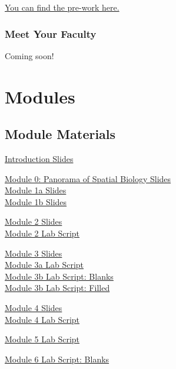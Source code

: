 \documentclass[
]{book}
\begin{document}
\href{https://docs.google.com/forms/d/e/1FAIpQLSeT3dlar3GpewcRe4Yjn5_Do0mR37brQ9eKeWmi2904_Q1AEw/viewform?usp=sf_link}{You can find the pre-work here.}

\hypertarget{meet-your-faculty}{%
\section{Meet Your Faculty}\label{meet-your-faculty}}

Coming soon!

\hypertarget{part-modules}{%
\part{Modules}\label{part-modules}}

\hypertarget{module-materials}{%
\chapter{Module Materials}\label{module-materials}}

\href{https://drive.google.com/file/d/1L0QxUN6YaxNonUczVfyQBeJ4-MWImSc7/view?usp=drive_link}{Introduction Slides}

\href{https://drive.google.com/file/d/1t4Z5u5fH88hJtrOAU6dHRmmnHvMF_LJF/view?usp=sharing}{Module 0: Panorama of Spatial Biology Slides}\\
\href{https://drive.google.com/file/d/1nr1rJdjv05NfZzsp0gYgUITMqX9g_YS_/view?usp=drive_link}{Module 1a Slides}\\
\href{https://drive.google.com/file/d/1B5CHM_i0i16G2MN8nRQLDdOtkq1K3ZKM/view?usp=drive_link}{Module 1b Slides}

\href{https://drive.google.com/file/d/1faXyFrfshZ-IyUOo7IYaj2YJI3Y0e8LF/view?usp=drive_link}{Module 2 Slides}\\
\href{https://drive.google.com/file/d/1b0klCLUidn7wMf9DmHmQ4W9uITMzAF_U/view?usp=drive_link}{Module 2 Lab Script}

\href{https://drive.google.com/file/d/1F6a8Sksim1tTmIXN6OXEKNIwN23yC5Kd/view?usp=drive_link}{Module 3 Slides}\\
\href{https://drive.google.com/file/d/1eluCP0JR7BhnJPMDiYn5mtWYWuaugflt/view?usp=drive_link}{Module 3a Lab Script}\\
\href{https://drive.google.com/file/d/1bPR5ja8SqT9tvpdiFCjLv1CoOBHbJLnw/view?usp=drive_link}{Module 3b Lab Script: Blanks}\\
\href{https://drive.google.com/file/d/1ZzUSo8_T9U2Iz3hOfTyUgA1zyYM5Cq9s/view?usp=drive_link}{Module 3b Lab Script: Filled}

\href{https://drive.google.com/file/d/1RM-NuEzzlGALL1HS4rc5DvxDsGWivOAa/view?usp=drive_link}{Module 4 Slides}\\
\href{https://drive.google.com/file/d/1aNyIe9fYdDB8rFZQcTs6UGcjO93zzixg/view?usp=drive_link}{Module 4 Lab Script}

\href{https://drive.google.com/file/d/1H8MeYzWk9ZtamZLplQdZCibEmogf0sGg/view?usp=drive_link}{Module 5 Lab Script}

\href{https://drive.google.com/file/d/1k3_Bg0q6qWkUD44QNy4uRsTpxuOlNFlx/view?usp=drive_link}{Module 6 Lab Script: Blanks}\\

  
\end{document}
